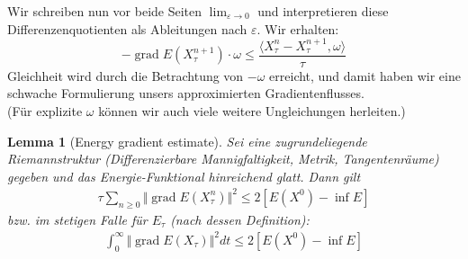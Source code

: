 \documentclass[11pt,a4paper,notitlepage]{scrreprt}
\newcommand{\grad}{\operatorname{grad}}
\newtheorem{lem}[defi]{Lemma}
\begin{document}
Wir schreiben nun vor beide Seiten $\lim_{\varepsilon\to 0}$ und interpretieren diese Differenzenquotienten als Ableitungen nach $\varepsilon$. Wir erhalten:
\begin{equation}
-\grad E(X_\tau^{n+1})\cdot\omega\leq \dfrac{\langle X_\tau^n-X_\tau^{n+1},\omega\rangle}{\tau}
\end{equation}
Gleichheit wird durch die Betrachtung von $-\omega$ erreicht, und damit haben wir eine schwache Formulierung unsers approximierten Gradientenflusses.\\
(Für explizite $\omega$ können wir auch viele weitere Ungleichungen herleiten.)

 
\newpage

\begin{lem}[Energy gradient estimate]
Sei eine zugrundeliegende Riemannstruktur (Differenzierbare Mannigfaltigkeit, Metrik, Tangentenräume) gegeben und das Energie-Funktional hinreichend glatt. Dann gilt 
\begin{eqnarray}
\tau \sum_{n\geq 0} \Vert\grad E(X_\tau^n)\Vert^2 \leq 2[E(X^0)-\inf E]
\end{eqnarray}
bzw. im stetigen Falle für $E_\tau$ (nach dessen Definition):
\begin{eqnarray}
\int_0^\infty \Vert\grad E(X_\tau)\Vert^2 dt\leq 2[E(X^0)-\inf E]
\label{Engrad}
\end{eqnarray}
\end{lem}
\end{document}
